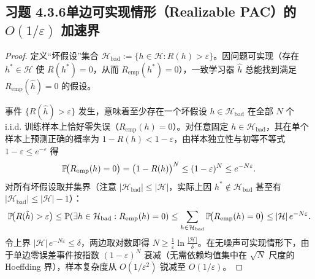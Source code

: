 \subsection*{习题 4.3.6\quad 单边可实现情形（Realizable PAC）的 $O(1/\varepsilon)$ 加速界}
\begin{proof}
定义“坏假设”集合 $\mathcal{H}_{\mathrm{bad}} := \{h \in \mathcal{H} : R(h) > \varepsilon\}$。因问题可实现（存在 $h^* \in \mathcal{H}$ 使 $R(h^*) = 0$，从而 $R_{\mathrm{emp}}(h^*) = 0$），一致学习器 $\hat{h}$ 总能找到满足 $R_{\mathrm{emp}}(\hat{h}) = 0$ 的假设。

事件 $\{R(\hat{h}) > \varepsilon\}$ 发生，意味着至少存在一个坏假设 $h \in \mathcal{H}_{\mathrm{bad}}$ 在全部 $N$ 个 i.i.d. 训练样本上恰好零失误（$R_{\mathrm{emp}}(h) = 0$）。对任意固定 $h \in \mathcal{H}_{\mathrm{bad}}$，其在单个样本上预测正确的概率为 $1 - R(h) < 1 - \varepsilon$，由样本独立性与初等不等式 $1 - \varepsilon \le e^{-\varepsilon}$ 得
\[
  \mathbb{P}\!\big(R_{\mathrm{emp}}(h) = 0\big) = \big(1 - R(h)\big)^N \le (1 - \varepsilon)^N \le e^{-N\varepsilon}.
\]
对所有坏假设取并集界（注意 $|\mathcal{H}_{\mathrm{bad}}| \le |\mathcal{H}|$，实际上因 $h^* \notin \mathcal{H}_{\mathrm{bad}}$ 甚至有 $|\mathcal{H}_{\mathrm{bad}}| \le |\mathcal{H}| - 1$）：
\[
  \mathbb{P}\!\big(R(\hat{h}) > \varepsilon\big)
  \le \mathbb{P}\!\left(\exists h \in \mathcal{H}_{\mathrm{bad}} : R_{\mathrm{emp}}(h) = 0\right)
  \le \sum_{h \in \mathcal{H}_{\mathrm{bad}}} \mathbb{P}\!\big(R_{\mathrm{emp}}(h) = 0\big)
  \le |\mathcal{H}|\, e^{-N\varepsilon}.
\]
令上界 $|\mathcal{H}|\, e^{-N\varepsilon} \le \delta$，两边取对数即得 $N \ge \frac{1}{\varepsilon}\ln\frac{|\mathcal{H}|}{\delta}$。在无噪声可实现情形下，由于单边零误差事件按指数 $(1-\varepsilon)^N$ 衰减（无需依赖均值集中在 $\sqrt{N}$ 尺度的 Hoeffding 界），样本复杂度从 $O(1/\varepsilon^2)$ 锐减至 $O(1/\varepsilon)$。
\end{proof}

